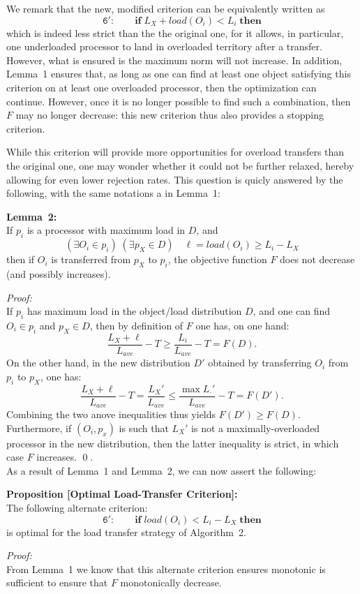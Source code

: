 We remark that the new, modified criterion can be equivalently written
as
\[
\mathtt{6':} \qquad \mathrm{\mathbf{if}} \; L_X + load(O_i) < L_i
\; \mathrm{\mathbf{then}}
\]
which is indeed less strict than the the original one, for it allows,
in particular, one underloaded processor to land in overloaded
territory after a transfer. However, what is ensured is the maximum
norm will not increase.
In addition, Lemma~1 ensures that, as long as one can find at least
one object satisfying this criterion on at least one overloaded
processor, then the optimization can continue. However, once it is no
longer possible to find such a combination, then $F$ may no longer
decrease: this new criterion thus also provides a stopping criterion.

While this criterion will provide more opportunities for overload
transfers than the original one, one may wonder whether it could not
be further relaxed, hereby allowing for even lower rejection rates.
This question is quicly answered by the following, with the same
notations a in Lemma~1:
\par\textbf{Lemma~2:}\\
If $p_i$ is a processor with maximum load in $D$, and
\[
(\exists O_i \in p_i)\; (\exists p_X \in D) \quad \ell = load(O_i) \ge{} L_i - L_X
\]
then if $O_i$ is transferred from $p_X$ to $p_i$, the objective
function $F$ does not decrease (and possibly increases).
\par\textit{Proof:}\\
If $p_i$ has maximum load in the object/load distribution $D$, and one
can find $O_i\in{}p_i$ and $p_X\in{}D$, then by definition of $F$ one
has, on one hand:
\[
\frac{L_X + \ell}{L_{ave}} - T \ge \frac{L_i}{L_{ave}} - T = F(D).
\]
On the other hand, in the new distribution $D'$ obtained by
transferring $O_i$ from $p_i$ to $p_X$, one has:
\[
\frac{L_X + \ell}{L_{ave}} - T = \frac{L_X'}{L_{ave}}
\le \frac{\max{L_{\cdot}'}}{L_{ave}} - T = F(D').
\]
Combining the two anove inequalities thus yields
$F(D')\ge{}F(D)$. Furthermore, if $(O_i,p_x)$ is such that $L_X'$ is
not a maximally-overloaded processor in the new distribution, then the
latter inequality is strict, in which case $F$ increases.
\hfill\qed.\\
As a result of Lemma~1 and Lemma~2, we can now assert the following:
\par\textbf{Proposition [Optimal Load-Transfer Criterion]:}\\
The following alternate criterion:
\[
\mathtt{6':} \qquad \mathrm{\mathbf{if}} \; load(O_i) < L_i - L_X
\; \mathrm{\mathbf{then}}
\] 
is optimal for the load transfer strategy of Algorithm~2.
\par\textit{Proof:}\\
From Lemma~1 we know that this alternate criterion ensures monotonic
is sufficient to ensure that $F$ monotonically decrease.

